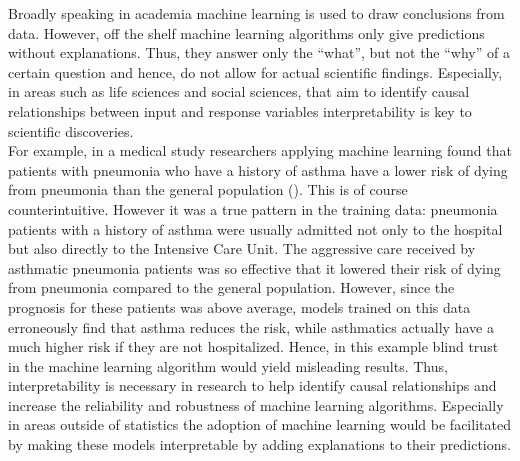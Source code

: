 \documentclass[]{krantz}
\begin{document}
Broadly speaking in academia machine learning is used to draw
conclusions from data. However, off the shelf machine learning
algorithms only give predictions without explanations. Thus, they answer
only the ``what'', but not the ``why'' of a certain question and hence,
do not allow for actual scientific findings. Especially, in areas such
as life sciences and social sciences, that aim to identify causal
relationships between input and response variables interpretability is
key to scientific discoveries.\\
For example, in a medical study researchers applying machine learning
found that patients with pneumonia who have a history of asthma have a
lower risk of dying from pneumonia than the general population
(\citet{caruana2015intelligible}). This is of course counterintuitive.
However it was a true pattern in the training data: pneumonia patients
with a history of asthma were usually admitted not only to the hospital
but also directly to the Intensive Care Unit. The aggressive care
received by asthmatic pneumonia patients was so effective that it
lowered their risk of dying from pneumonia compared to the general
population. However, since the prognosis for these patients was above
average, models trained on this data erroneously find that asthma
reduces the risk, while asthmatics actually have a much higher risk if
they are not hospitalized. Hence, in this example blind trust in the
machine learning algorithm would yield misleading results. Thus,
interpretability is necessary in research to help identify causal
relationships and increase the reliability and robustness of machine
learning algorithms. Especially in areas outside of statistics the
adoption of machine learning would be facilitated by making these models
interpretable by adding explanations to their predictions.
\end{document}
